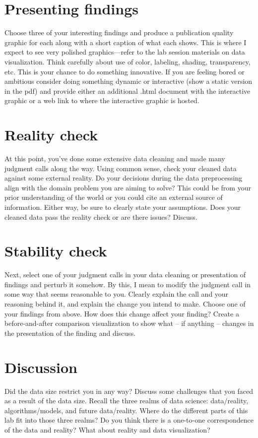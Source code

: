 \documentclass[10pt,letterpaper]{article}
\begin{document}
\section*{Presenting findings}

Choose three of your interesting findings and produce a publication quality graphic for each along with a short caption of what each shows. This is where I expect to see very polished graphics---refer to the lab session materials on data visualization. Think carefully about use of color, labeling, shading, transparency, etc. This is your chance to do something innovative. If you are feeling bored or ambitious consider doing something dynamic or interactive (show a static version in the pdf) and provide either an additional .html document with the interactive graphic or a web link to where the interactive graphic is hosted.

\section*{Reality check}

At this point, you’ve done some extensive data cleaning and made many judgment calls along the way. Using common sense, check your cleaned data against some external reality. Do your decisions during the data preprocessing align with the domain problem you are aiming to solve? This could be from your prior understanding of the world or you could cite an external source of information. Either way, be sure to clearly state your assumptions. Does your cleaned data pass the reality check or are there issues? Discuss.

\section*{Stability check}

Next, select one of your judgment calls in your data cleaning or presentation of findings and perturb it somehow. By this, I mean to modify the judgment call in some way that seems reasonable to you. Clearly explain the call and your reasoning behind it, and explain the change you intend to make. Choose one of your findings from above. How does this change affect your finding? Create a before-and-after comparison visualization to show what – if anything – changes in the presentation of the finding and discuss.

\section*{Discussion}

Did the data size restrict you in any way? Discuss some challenges that you faced as a result of the data size. Recall the three realms of data science: data/reality, algorithms/models, and future data/reality. Where do the different parts of this lab fit into those three realms? Do you think there is a one-to-one correspondence of the data and reality? What about reality and data visualization?
\end{document}
